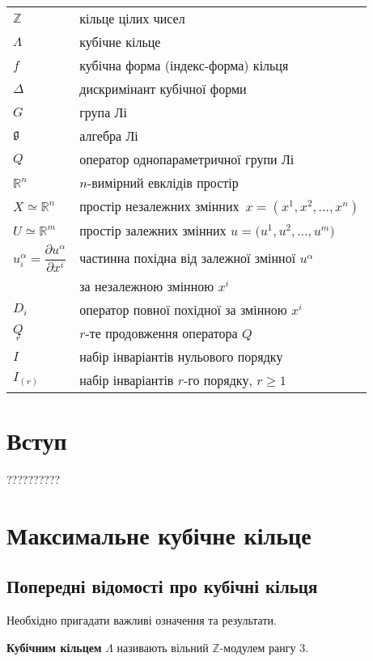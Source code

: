 \documentclass{thesis}
\begin{document}
\begin{tabular}{ll}
$\mathbb{Z}$ & кільце цілих чисел\\
$\Lambda$ & кубічне кільце\\
$f$ & кубічна форма (індекс-форма) кільця\\
$\Delta$ & дискримінант кубічної форми\\
$G$ & група Лі\\
$\mathfrak g$ & алгебра Лі\\
$Q$ & оператор однопараметричної групи Лі\\[1mm]
$\mathbb R^n$ & $n$-вимірний евклідів простір\\[1mm]
$X\simeq {\mathbb R}^n$ & простір незалежних змінних~$x=(x^1,x^2,\ldots, x^n)$ \\[1mm]
$U\simeq {\mathbb R}^m$ & простір залежних змінних $u=\big(u^1, u^2, \ldots, u^m\big)$\\[1mm]
$u^\alpha_i=\dfrac{\partial u^\alpha}{\partial x^i}$ & частинна похідна від залежної змінної $u^\alpha$\\[1mm]
& за незалежною змінною $x^i$\\[1mm]
$D_{i}$ & оператор повної похідної за змінною $x^{i}$\\[1mm]
$\underset{r}{Q}$ & $r$-те продовження оператора $Q$\\[1mm]
$I$ & набір інваріантів нульового порядку\\[1mm]
$I_{(r)}$ & набір інваріантів $r$-го порядку, $r\geq 1$

\end{tabular}


\newpage

\chapter*{Вступ}\label{Introduction}

??????????
\cite{boyko-thesis,boyko2021,PopovychBoykoNesterenkoLutfullin2003}

\newpage

\chapter{Максимальне кубічне кільце}\label{chaper1}

\section{Попередні відомості про кубічні кільця}\label{section1.1}
Необхідно пригадати важливі означення та результати.
\begin{definition}
\textbf{Кубічним кільцем} $\Lambda$ називають вільний $\mathbb{Z}$-модулем рангу $3$.
\end{definition}
\end{document}
